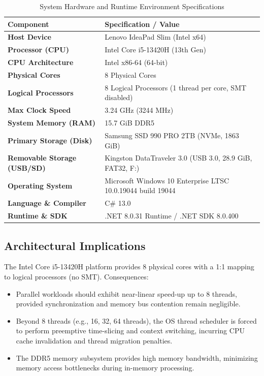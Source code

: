 \documentclass[12pt,a4paper]{article}
\begin{document}
\begin{table}[htbp]
\centering
\caption{System Hardware and Runtime Environment Specifications}
\label{tab:hardware_specs}
\small
\begin{tabularx}{\textwidth}{lX}
\toprule
\textbf{Component} & \textbf{Specification / Value} \\
\midrule
\textbf{Host Device} & Lenovo IdeaPad Slim (Intel x64) \\
\textbf{Processor (CPU)} & Intel Core i5-13420H (13th Gen) \\
\textbf{CPU Architecture} & Intel x86-64 (64-bit) \\
\textbf{Physical Cores} & 8 Physical Cores \\
\textbf{Logical Processors} & 8 Logical Processors (1 thread per core, SMT disabled) \\
\textbf{Max Clock Speed} & 3.24 GHz (3244 MHz) \\
\textbf{System Memory (RAM)} & 15.7 GiB DDR5 \\
\textbf{Primary Storage (Disk)} & Samsung SSD 990 PRO 2TB (NVMe, 1863 GiB) \\
\textbf{Removable Storage (USB/SD)} & Kingston DataTraveler 3.0 (USB 3.0, 28.9 GiB, FAT32, F:) \\
\textbf{Operating System} & Microsoft Windows 10 Enterprise LTSC 10.0.19044 build 19044 \\
\textbf{Language \& Compiler} & C\# 13.0 \\
\textbf{Runtime \& SDK} & .NET 8.0.31 Runtime / .NET SDK 8.0.400 \\
\bottomrule
\end{tabularx}
\end{table}

\subsection{Architectural Implications}
The Intel Core i5-13420H platform provides 8 physical cores with a 1:1 mapping to logical processors (no SMT). Consequences:
\begin{itemize}
    \item Parallel workloads should exhibit near-linear speed-up up to 8 threads, provided synchronization and memory bus contention remain negligible.
    \item Beyond 8 threads (e.g., 16, 32, 64 threads), the OS thread scheduler is forced to perform preemptive time-slicing and context switching, incurring CPU cache invalidation and thread migration penalties.
    \item The DDR5 memory subsystem provides high memory bandwidth, minimizing memory access bottlenecks during in-memory processing.
\end{itemize}
\end{document}

